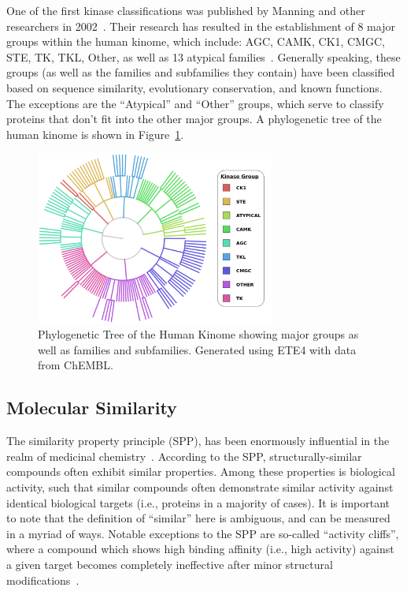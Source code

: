 \documentclass[11pt]{article}
\begin{document}
One of the first kinase classifications was published by Manning and other researchers in 2002~\cite{manning_2002}. 
Their research has resulted in the establishment of 8 major groups within the human kinome, which include: AGC, CAMK, CK1, CMGC, STE, TK, TKL, Other, as well as 13 atypical families~\cite{eid_turk_volkamer_rippmann_fulle_2017}.
Generally speaking, these groups (as well as the families and subfamilies they contain) have been classified based on sequence similarity, evolutionary conservation, and known functions. The exceptions are the ``Atypical'' and ``Other'' groups, which serve to classify proteins that don't fit into the other major groups. 
A phylogenetic tree of the human kinome is shown in Figure~\ref{fig:fam_tree}. %

\begin{figure}[H]
    \centering
    \includegraphics[width=0.7\textwidth]{../figures/protein_family_tree.png}
    \caption{Phylogenetic Tree of the Human Kinome showing major groups as well as families and subfamilies. Generated using ETE4 with data from ChEMBL.}\label{fig:fam_tree}
\end{figure}


\subsection{Molecular Similarity}
The similarity property principle (SPP), has been enormously influential in the realm of medicinal chemistry~\cite{maggiora_vogt_stumpfe_bajorath_2013}. 
According to the SPP, structurally-similar compounds often exhibit similar properties. 
Among these properties is biological activity, such that similar compounds often demonstrate similar activity against identical biological targets (i.e., proteins in a majority of cases). 
It is important to note that the definition of “similar” here is ambiguous, and can be measured in a myriad of ways.
Notable exceptions to the SPP are so-called ``activity cliffs'', where a compound which shows high binding affinity (i.e., high activity) against a given target becomes completely ineffective after minor structural modifications~\cite{maggiora_vogt_stumpfe_bajorath_2013,filip_miljkovic_jurgen_bajorath_2018}. 
\end{document}
